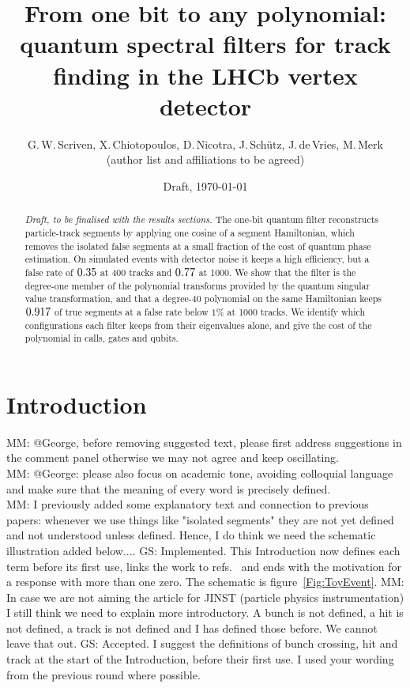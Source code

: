 \documentclass[11pt,a4paper]{article}
\title{From one bit to any polynomial:\\ quantum spectral filters for track finding in the LHCb vertex detector}
\author{G.\,W.\,Scriven, X.\,Chiotopoulos, D.\,Nicotra, J.\,Sch\"utz, J.\,de\,Vries, M.\,Merk\\
\small (author list and affiliations to be agreed)}
\date{Draft, \today}
\newcommand{\mm}[1]{{\color{purple} MM: #1 }}
\newcommand{\gs}[1]{{\color{orange!85!black} GS: #1 }}
\begin{document}
\maketitle

\begin{abstract}
\noindent\textit{Draft, to be finalised with the results sections.}
The one-bit quantum filter reconstructs particle-track segments by applying one cosine of a
segment Hamiltonian, which removes the isolated false segments at a small fraction of the cost
of quantum phase estimation. On simulated events with detector noise it keeps a high
efficiency, but a false rate of $0.35$ at 400 tracks and $0.77$
at 1000. We show that the filter is the degree-one member of the polynomial transforms
provided by the quantum singular value transformation, and that a degree-40 polynomial on the
same Hamiltonian keeps $0.917$ of true segments at a false rate below $1\%$ at 1000
tracks. We identify which configurations each filter keeps from their eigenvalues alone, and
give the cost of the polynomial in calls, gates and qubits.
\end{abstract}

\section{Introduction}

\mm{@George, before removing suggested text, please first address suggestions in the comment panel otherwise we may not agree and keep oscillating.}\\

\mm{@George: please also focus on academic tone, avoiding colloquial language and make sure that the meaning of every word is precisely defined.}\\

\mm{I previously added some explanatory text and connection to previous papers: whenever we use things like "isolated segments" they are not yet defined and not understood unless defined. Hence, I do think we need the schematic illustration added below....} \gs{Implemented. This Introduction now defines each term before its first use, links the work to refs.~\cite{nicotra2023,trackhhl} and ends with the motivation for a response with more than one zero. The schematic is figure~\ref{Fig:ToyEvent}.}
\mm{In case we are not aiming the article for JINST (particle physics instrumentation) I still think we need to explain more introductory. A bunch is not defined, a hit is not defined, a track is not defined and I has defined those before. We cannot leave that out.} \gs{Accepted. I suggest the definitions of bunch crossing, hit and track at the start of the Introduction, before their first use. I used your wording from the previous round where possible.}
\end{document}
